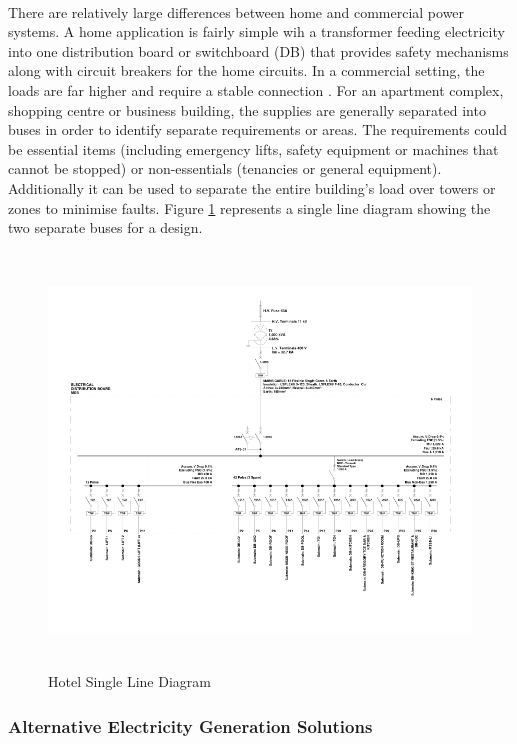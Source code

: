 \paragraph{}
There are relatively large differences between home and commercial power systems. A home application is fairly simple wih a transformer feeding electricity into one distribution board or switchboard (DB) that provides safety mechanisms along with circuit breakers for the home circuits. In a commercial setting, the loads are far higher and require a stable connection \cite{Baran2003}. For an apartment complex, shopping centre or business building, the supplies are generally separated into buses in order to identify separate requirements or areas. The requirements could be essential items (including emergency lifts, safety equipment or machines that cannot be stopped) or non-essentials (tenancies or general equipment). Additionally it can be used to separate the entire building's load over towers or zones to minimise faults. Figure \ref{fig:SLD} represents a single line diagram showing the two separate buses for a design. 

\begin{figure}[H]
\hfill\includegraphics[width = 160mm, height = 110mm]{images/PCad_SLD}\hspace*{\fill}
\caption{{Hotel Single Line Diagram}}
\label{fig:SLD}
\end{figure}       

\subsubsection{Alternative Electricity Generation Solutions}

